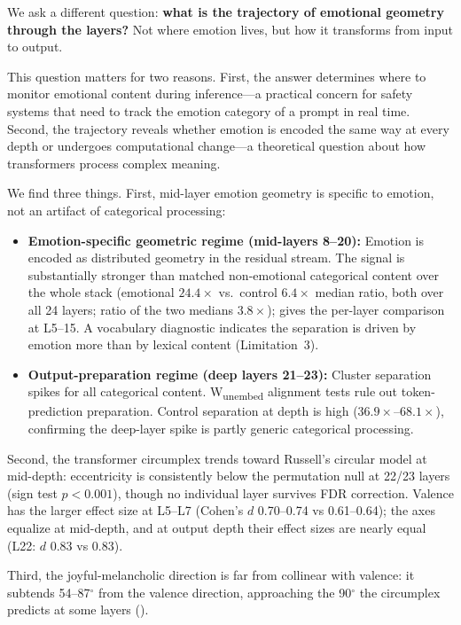 \documentclass[11pt,a4paper]{article}
\begin{document}
We ask a different question: \textbf{what is the trajectory of emotional
geometry through the layers?} Not where emotion lives, but how it
transforms from input to output.

This question matters for two reasons. First, the answer determines
where to monitor emotional content during inference---a practical concern
for safety systems that need to track the emotion category of a prompt
in real time. Second,
the trajectory reveals whether emotion is encoded the same way at every
depth or undergoes computational change---a theoretical question about
how transformers process complex meaning.

We find three things. First, mid-layer emotion geometry is specific to
emotion, not an artifact of categorical processing:

\begin{itemize}[nosep]
    \item \textbf{Emotion-specific geometric regime (mid-layers 8--20):}
          Emotion is encoded as distributed geometry in the residual
          stream. The signal is substantially stronger than matched
          non-emotional categorical content over the whole stack (emotional
          $24.4\times$ vs.\ control $6.4\times$ median ratio, both over all 24 layers;
          ratio of the two medians $3.8\times$);  gives the
          per-layer comparison at L5--15. A vocabulary diagnostic
          indicates the separation is driven by emotion more than by
          lexical content (Limitation~3).
    \item \textbf{Output-preparation regime (deep layers 21--23):}
          Cluster separation spikes for all categorical content.
          W\textsubscript{unembed} alignment tests rule out
          token-prediction preparation. Control separation at depth
          is high ($36.9\times$--$68.1\times$), confirming the deep-layer
          spike is partly generic categorical processing.
\end{itemize}

Second, the transformer circumplex trends toward
Russell's circular model at mid-depth: eccentricity is consistently
below the permutation null at 22/23 layers (sign test $p < 0.001$),
though no individual layer survives FDR correction. Valence has the
larger effect size at L5--L7 (Cohen's $d$
0.70--0.74 vs 0.61--0.64); the axes equalize at mid-depth, and at output
depth their effect sizes are nearly equal (L22: $d$ 0.83 vs 0.83).

Third, the joyful-melancholic direction is far from collinear with
valence: it subtends 54--87$^\circ$ from the valence direction,
approaching the 90$^\circ$ the circumplex predicts at some layers
().
\end{document}
